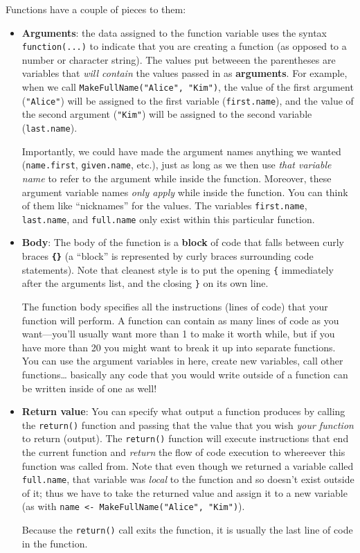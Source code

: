 \documentclass[]{book}
\theoremstyle{definition}
\theoremstyle{definition}
\theoremstyle{remark}
\begin{document}
Functions have a couple of pieces to them:

\begin{itemize}
\item
  \textbf{Arguments}: the data assigned to the function variable uses
  the syntax \texttt{function(...)} to indicate that you are creating a
  function (as opposed to a number or character string). The values put
  betweeen the parentheses are variables that \emph{will contain} the
  values passed in as \textbf{arguments}. For example, when we call
  \texttt{MakeFullName("Alice",\ "Kim")}, the value of the first
  argument (\texttt{"Alice"}) will be assigned to the first variable
  (\texttt{first.name}), and the value of the second argument
  (\texttt{"Kim"}) will be assigned to the second variable
  (\texttt{last.name}).

  Importantly, we could have made the argument names anything we wanted
  (\texttt{name.first}, \texttt{given.name}, etc.), just as long as we
  then use \emph{that variable name} to refer to the argument while
  inside the function. Moreover, these argument variable names
  \emph{only apply} while inside the function. You can think of them
  like ``nicknames'' for the values. The variables \texttt{first.name},
  \texttt{last.name}, and \texttt{full.name} only exist within this
  particular function.
\item
  \textbf{Body}: The body of the function is a \textbf{block} of code
  that falls between curly braces \textbf{\texttt{\{\}}} (a ``block'' is
  represented by curly braces surrounding code statements). Note that
  cleanest style is to put the opening \texttt{\{} immediately after the
  arguments list, and the closing \texttt{\}} on its own line.

  The function body specifies all the instructions (lines of code) that
  your function will perform. A function can contain as many lines of
  code as you want---you'll usually want more than 1 to make it worth
  while, but if you have more than 20 you might want to break it up into
  separate functions. You can use the argument variables in here, create
  new variables, call other functions\ldots{} basically any code that
  you would write outside of a function can be written inside of one as
  well!
\item
  \textbf{Return value}: You can specify what output a function produces
  by calling the \texttt{return()} function and passing that the value
  that you wish \emph{your function} to return (output). The
  \texttt{return()} function will execute instructions that end the
  current function and \emph{return} the flow of code execution to
  whereever this function was called from. Note that even though we
  returned a variable called \texttt{full.name}, that variable was
  \emph{local} to the function and so doesn't exist outside of it; thus
  we have to take the returned value and assign it to a new variable (as
  with \texttt{name\ \textless{}-\ MakeFullName("Alice",\ "Kim")}).

  Because the \texttt{return()} call exits the function, it is usually
  the last line of code in the function.
\end{itemize}
\end{document}
